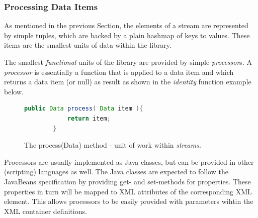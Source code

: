 \subsubsection{Processing Data Items}
As mentioned in the previous Section, the elements of a stream are
represented by simple tuples, which are backed by a plain hashmap of
keys to values. These items are the smallest units of data within the
\streams library. 

The smallest {\em functional} units of the \streams library are
provided by simple {\em processor}s.  A {\em processor} is essentially
a function that is applied to a data item and which returns a data
item (or {\ttfamily null}) as result as shown in the {\em identity}
function example below.
\begin{figure}[h!]
   \begin{lstlisting}[language=Java,showstringspaces=false]
	    public Data process( Data item ){
	    	return item;
	    }
   \end{lstlisting}
   \caption{\label{fig:processMethod}The {\ttfamily process(Data)} method - unit of work within {\em streams}.}
\end{figure}

Processors are usually implemented as Java classes, but can be
provided in other (scripting) languages as well. The Java classes are
expected to follow the JavaBeans specification by providing {\ttfamily
  get}- and {\ttfamily set}-methods for properties.  These properties
in turn will be mapped to XML attributes of the corresponding XML
element. This allows processors to be easily provided with parameters
wihtin the XML container definitions.
